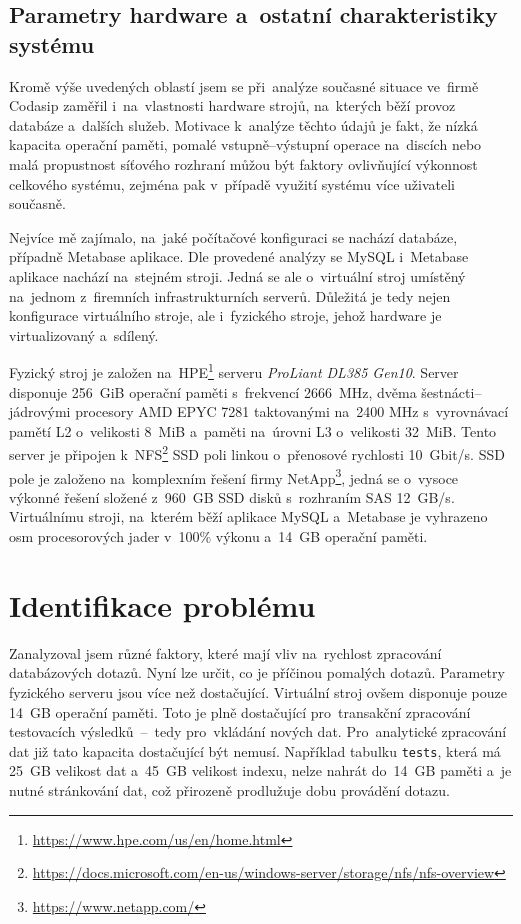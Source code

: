 \subsection{Parametry hardware a~ostatní charakteristiky systému}
\label{subsection:parametry_hardware}
Kromě výše uvedených oblastí jsem se při~analýze současné situace ve~firmě Codasip zaměřil i~na~vlastnosti hardware strojů, na~kterých běží provoz databáze a~dalších služeb. Motivace k~analýze těchto údajů je fakt, že nízká kapacita operační paměti, pomalé vstupně--výstupní operace na~discích nebo malá propustnost síťového rozhraní můžou být faktory ovlivňující výkonnost celkového systému, zejména pak v~případě využití systému více uživateli současně.

Nejvíce mě zajímalo, na~jaké počítačové konfiguraci se nachází databáze, případně Metabase aplikace. Dle provedené
analýzy se MySQL i~Metabase aplikace nachází na~stejném stroji. Jedná se ale o~virtuální stroj umístěný na~jednom
z~firemních infrastrukturních serverů. Důležitá je tedy nejen konfigurace virtuálního stroje, ale i~fyzického stroje, jehož hardware je virtualizovaný a~sdílený.

Fyzický stroj je založen na~HPE\footnote{\href{https://www.hpe.com/us/en/home.html}{https://www.hpe.com/us/en/home.html}} serveru \textit{ProLiant DL385 Gen10}. Server disponuje 256~GiB operační paměti s~frekvencí 2666~MHz, dvěma
šestnácti--jádrovými procesory AMD EPYC 7281 taktovanými na~2400 MHz s~vyrovnávací pamětí L2 o~velikosti 8~MiB
a~paměti na~úrovni L3 o~velikosti 32~MiB. Tento server je připojen
k~NFS\footnote{\href{https://docs.microsoft.com/en-us/windows-server/storage/nfs/nfs-overview}{https://docs.microsoft.com/en-us/windows-server/storage/nfs/nfs-overview}} SSD poli linkou o~přenosové rychlosti 10~Gbit/s. SSD pole je
založeno na~komplexním řešení firmy NetApp\footnote{\href{https://www.netapp.com/}{https://www.netapp.com/}}, jedná
se o~vysoce výkonné řešení složené z~960~GB SSD disků s~rozhraním SAS 12~GB/s.
Virtuálnímu stroji, na~kterém běží aplikace MySQL a~Metabase je vyhrazeno osm procesorových jader v~100\% výkonu
a~14~GB operační paměti.

\section{Identifikace problému}
\label{section:identifikace_problemu}
Zanalyzoval jsem různé faktory, které mají vliv na~rychlost zpracování databázových dotazů. Nyní lze určit, co je
příčinou pomalých dotazů. Parametry fyzického serveru jsou více než dostačující. Virtuální stroj ovšem disponuje
pouze 14~GB operační paměti. Toto je plně dostačující pro~transakční zpracování testovacích výsledků~--~tedy
pro~vkládání nových dat. Pro~analytické zpracování dat již tato kapacita dostačující být nemusí. Například tabulku
\texttt{tests}, která má 25~GB velikost dat a~45~GB velikost indexu, nelze nahrát do~14~GB paměti a~je nutné
stránkování dat, což přirozeně prodlužuje dobu provádění dotazu.


